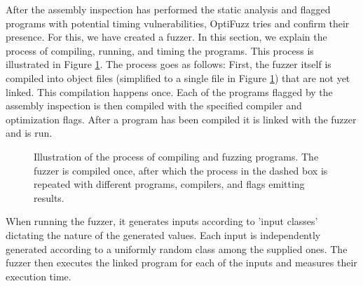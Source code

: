 \label{sec:fuzzing}
After the assembly inspection has performed the static analysis and flagged programs with potential timing vulnerabilities, OptiFuzz tries and confirm their presence. 
For this, we have created a fuzzer.
In this section, we explain the process of compiling, running, and timing the programs.
This process is illustrated in Figure \ref{fig:fuzzer-pipeline}.
The process goes as follows: 
First, the fuzzer itself is compiled into object files (simplified to a single file in Figure \ref{fig:fuzzer-pipeline}) that are not yet linked. 
This compilation happens once.
Each of the programs flagged by the assembly inspection is then compiled with the specified compiler and optimization flags.
After a program has been compiled it is linked with the fuzzer and is run.

\begin{figure}[H]
    \centering
    
    \caption{Illustration of the process of compiling and fuzzing programs. The fuzzer is compiled once, after which the process in the dashed box is repeated with different programs, compilers, and flags emitting results.}
    \label{fig:fuzzer-pipeline}
\end{figure}

When running the fuzzer, it generates inputs according to 'input classes' dictating the nature of the generated values.
Each input is independently generated according to a uniformly random class among the supplied ones.
The fuzzer then executes the linked program for each of the inputs and measures their execution time.

